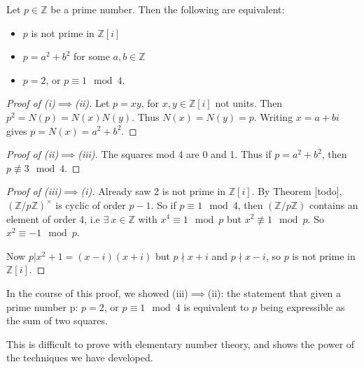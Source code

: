 \documentclass[egregdoesnotlikesansseriftitles,a4paper]{scrartcl}
\begin{document}
\begin{proposition}
       Let $p \in \mathbb{Z}$ be a prime number. Then the following are equivalent: 
       \begin{itemize}
             \item[(i)] $p$ is not prime in $\mathbb{Z}[i]$
             \item[(ii)] $p= a^2+b^2$ for some $a,b \in \mathbb{Z}$ 
             \item[(iii)] $p=2$, or $p \equiv 1 \mod 4$.
       \end{itemize}
       \begin{proof}[Proof of (i)$\implies$(ii)]
              Let $p=xy$, for $x,y \in \mathbb{Z}[i]$ not units. Then $p^2= N (p)=N (x)N (y)$. Thus $N (x)=N (y)=p$. Writing $x=a+bi$ gives $p=N (x)=a^2+b^2$.
       \end{proof}
       \begin{proof}[Proof of (ii)$\implies$(iii)]
            The squares mod 4 are 0 and 1. Thus if $p=a^2+b^2$, then $p \not \equiv 3 \mod 4$.
      \end{proof}
      \begin{proof}[Proof of (iii)$\implies$(i)]
            Already saw 2 is not prime in $\mathbb{Z}[i]$. By Theorem [todo], $(\mathbb{Z}/p\mathbb{Z})^{\times}$ is cyclic of order $p-1$. So if $p \equiv 1 \mod 4$, then $(\mathbb{Z}/p\mathbb{Z})$ contains an element of order 4, i.e $\exists \ x \in \mathbb{Z}$ with $x^{4} \equiv 1 \mod p$ but $x^2 \not \equiv 1 \mod p$. So $x^2 \equiv -1 \mod p$. 
            
            Now $p | x^2+1 = (x-i)(x+i)$ but $p \nmid x+i$ and $p \nmid x-i$, so $p$ is not prime in $\mathbb{Z}[i]$.
     \end{proof}
     \begin{remark}
            In the course of this proof, we showed (iii)$\implies $(ii): the statement that given a prime number p: $p=2$, or $p \equiv 1 \mod 4$ is equivalent to $p$ being expressible as the sum of two squares. 

            This is difficult to prove with elementary number theory, and shows the power of the techniques we have developed.
     \end{remark}
\end{proposition}
\end{document}
